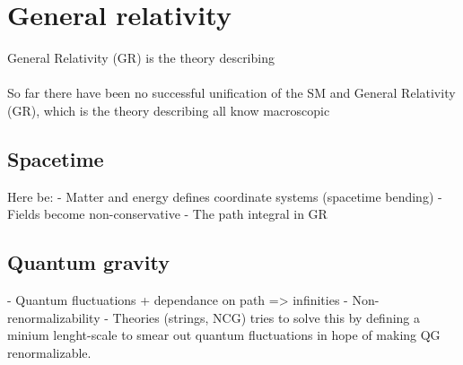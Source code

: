 \section{General relativity}
General Relativity (GR) is the theory describing
\\ \\
So far there have been no successful unification of the SM and General Relativity (GR), which is the theory describing all know macroscopic

\subsection{Spacetime}
Here be:
- Matter and energy defines coordinate systems (spacetime bending)
- Fields become non-conservative
- The path integral in GR

\subsection{Quantum gravity}
- Quantum fluctuations + dependance on path => infinities
- Non-renormalizability
- Theories (strings, NCG) tries to solve this by defining a minium lenght-scale
  to smear out quantum fluctuations in hope of making QG renormalizable.